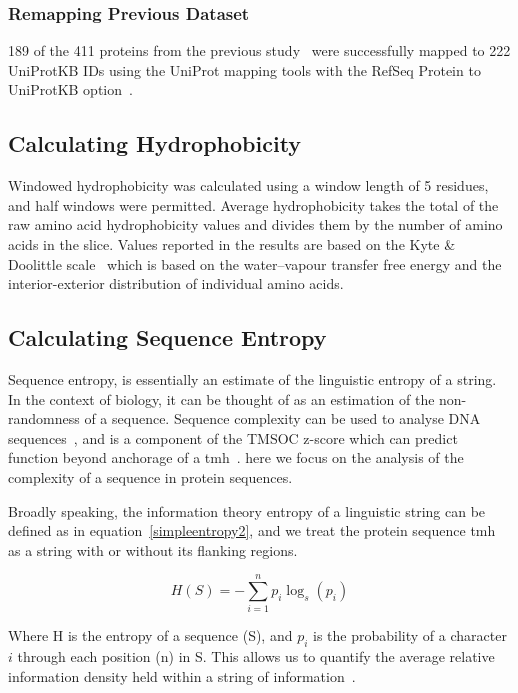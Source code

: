\subsubsection{Remapping Previous Dataset}
189 of the 411 proteins from the previous study~\cite{Kalbfleisch2007} were successfully mapped to 222 UniProtKB IDs using the UniProt mapping tools with the RefSeq Protein to UniProtKB option~\cite{TheUniProtConsortium2014}.

\subsection{Calculating Hydrophobicity}
Windowed hydrophobicity was calculated using a window length of 5 residues, and half windows were permitted.
Average hydrophobicity takes the total of the raw amino acid hydrophobicity values and divides them by the number of amino acids in the slice.
Values reported in the results are based on the Kyte \& Doolittle scale~\cite{Kyte1982} which is based on the water\---vapour transfer free energy and the interior-exterior distribution of individual amino acids.

\subsection{Calculating Sequence Entropy}
Sequence entropy, is essentially an estimate of the linguistic entropy of a string.
In the context of biology, it can be thought of as an estimation of the non-randomness of a sequence.
Sequence complexity can be used to analyse DNA sequences~\cite{Pinho2013, Oliver1993, Troyanskaya2002}, and is a component of the TMSOC z-score which can predict function beyond anchorage of a \gls{tmh}~\cite{Wong2011, Wong2012, Baker2017}.
here we focus on the analysis of the complexity of a sequence in protein sequences.

Broadly speaking, the information theory entropy of a linguistic string can be defined as in equation~\ref{simpleentropy2}, and we treat the protein sequence \gls{tmh} as a string with or without its flanking regions.

\begin{equation} \label{simpleentropy2}
	H(S)=-{\sum_{i=1}^n {p_i\log_s(p_i)}}
\end{equation}

Where H is the entropy of a sequence (S), and $p_i$ is the probability of a character $i$ through each position (n) in S. This allows us to quantify the average relative information density held within a string of information~\cite{Shannon1948}.

